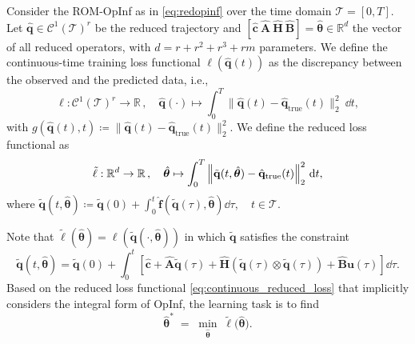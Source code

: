 \begin{definition} 
    \label{def:continuous_loss}
    Consider the ROM-OpInf as in \eqref{eq:redopinf} over the time domain $\mathcal{T}=[0,T]$. Let $\hat{\mathbf{q}}\in\mathcal{C}^1(\mathcal{T})^r$ be the reduced trajectory and $[\hat{\mathbf{c}}~\hat{\mathbf{A}}~\hat{\mathbf{H}}~\hat{\mathbf{B}}]=\hat{\bm{\theta}}\in\mathbb{R}^d$ the vector of all reduced operators, with $d=r+r^2+r^3+rm$ parameters. We define the continuous-time training loss functional $\ell(\hat{\mathbf{q}}(t))$ as the discrepancy between the observed and the predicted data, i.e.,\\
    \begin{equation}
        \ell: \mathcal{C}^1(\mathcal{T})^r  \to \mathbb{R}\,,\quad \hat{\mathbf{q}}(\cdot) \mapsto \int_0^T \Big\|\hat{\mathbf{q}}(t) - \hat{\mathbf{q}}_\mathrm{true}(t)\Big\|_2^2~\dd t,
        \label{eq:continuous_loss}
    \end{equation}
    with $g(\hat{\mathbf{q}}(t),t) \coloneqq \Big\|\hat{\mathbf{q}}(t) - \hat{\mathbf{q}}_\mathrm{true}(t)\Big\|_2^2$. We define the reduced loss functional as\\ 
    \begin{equation}
        \tilde{\ell}: \mathbb{R}^d  \to \mathbb{R}\,,\quad \hat{\bm{\theta}} \mapsto \int_0^T \norm{\tilde{\mathbf{q}}(t,\hat{\bm{\theta}}) - \hat{\mathbf{q}}_\mathrm{true}(t)}_2^2~\dd t,
        \label{eq:continuous_reduced_loss}
    \end{equation}
    where $\tilde{\mathbf{q}}(t, \hat{\bm{\theta}}) \coloneqq \tilde{\mathbf{q}}(0) + \displaystyle\int_{0}^t \hat{\mathbf{f}}(\tilde{\mathbf{q}}(\tau),\hat{\bm{\theta}})\dd \tau, \quad t\in\mathcal{T}$.

\end{definition}
Note that $\tilde{\ell}(\hat{\bm{\theta}}) = \ell(\tilde{\mathbf{q}}(\cdot,\hat{\bm{\theta}}))$ in which $\tilde{\mathbf{q}}$ satisfies the constraint\\ 
$$\tilde{\mathbf{q}}(t, \hat{\bm{\theta}}) = \tilde{\mathbf{q}}(0) + \displaystyle\int_{0}^t\left[ \hat{\mathbf{c}} + \hat{\mathbf{A}}\tilde{\mathbf{q}}(\tau) + \hat{\mathbf{H}}\left(\tilde{\mathbf{q}}(\tau)\otimes\tilde{\mathbf{q}}(\tau) \right) +\hat{\mathbf{B}}\mathbf{u}(\tau) \right]\dd \tau.$$
Based on the reduced loss functional \eqref{eq:continuous_reduced_loss} that implicitly considers the integral form of OpInf, the learning task is to find\\
\begin{equation}
  \hat{\bm{\theta}}^*
  \;=\;
  \min_{\hat{\bm{\theta}}}\;
  \tilde{\ell}\bigl(\hat{\bm{\theta}}\bigr).
\end{equation}
